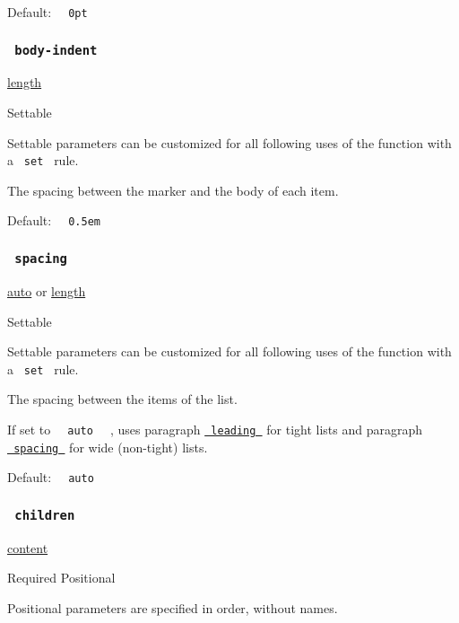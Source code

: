 Default: \texttt{\ }{\texttt{\ 0pt\ }}\texttt{\ }

\subsubsection{\texorpdfstring{\texttt{\ body-indent\ }}{ body-indent }}\label{parameters-body-indent}

\href{/docs/reference/layout/length/}{length}

{{ Settable }}

\label{parameters-body-indent-settable-tooltip}
Settable parameters can be customized for all following uses of the
function with a \texttt{\ set\ } rule.

The spacing between the marker and the body of each item.

Default: \texttt{\ }{\texttt{\ 0.5em\ }}\texttt{\ }

\subsubsection{\texorpdfstring{\texttt{\ spacing\ }}{ spacing }}\label{parameters-spacing}

\href{/docs/reference/foundations/auto/}{auto} {or}
\href{/docs/reference/layout/length/}{length}

{{ Settable }}

\label{parameters-spacing-settable-tooltip}
Settable parameters can be customized for all following uses of the
function with a \texttt{\ set\ } rule.

The spacing between the items of the list.

If set to \texttt{\ }{\texttt{\ auto\ }}\texttt{\ } , uses paragraph
\href{/docs/reference/model/par/\#parameters-leading}{\texttt{\ leading\ }}
for tight lists and paragraph
\href{/docs/reference/model/par/\#parameters-spacing}{\texttt{\ spacing\ }}
for wide (non-tight) lists.

Default: \texttt{\ }{\texttt{\ auto\ }}\texttt{\ }

\subsubsection{\texorpdfstring{\texttt{\ children\ }}{ children }}\label{parameters-children}

\href{/docs/reference/foundations/content/}{content}

{Required} {{ Positional }}

\label{parameters-children-positional-tooltip}
Positional parameters are specified in order, without names.

